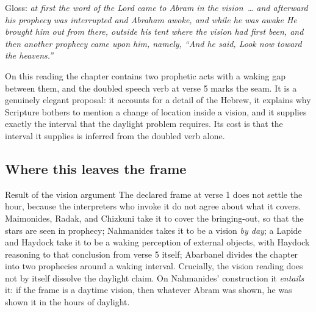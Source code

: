 \noindent Gloss: \emph{at first the word of the Lord came to Abram in the
vision~\dots{} and afterward his prophecy was interrupted and Abraham awoke, and
while he was awake He brought him out from there, outside his tent where the
vision had first been, and then another prophecy came upon him, namely, ``And he
said, Look now toward the heavens.''}

On this reading the chapter contains two prophetic acts with a waking gap
between them, and the doubled speech verb at verse 5 marks the seam. It is a
genuinely elegant proposal: it accounts for a detail of the Hebrew, it explains
why Scripture bothers to mention a change of location inside a vision, and it
supplies exactly the interval that the daylight problem requires. Its cost is
that the interval it supplies is inferred from the doubled verb alone.

\subsection{Where this leaves the frame}

\begin{studybox}{Result of the vision argument}
The declared frame at verse 1 does not settle the hour, because the interpreters
who invoke it do not agree about what it covers. Maimonides, Radak, and Chizkuni
take it to cover the bringing-out, so that the stars are seen in prophecy;
Nahmanides takes it to be a vision \emph{by day}; a Lapide and Haydock take it
to be a waking perception of external objects, with Haydock reasoning to that
conclusion from verse 5 itself; Abarbanel divides the chapter into two prophecies
around a waking interval. Crucially, the vision reading does not by itself
dissolve the daylight claim. On Nahmanides' construction it \emph{entails} it:
if the frame is a daytime vision, then whatever Abram was shown, he was shown it
in the hours of daylight.
\end{studybox}
